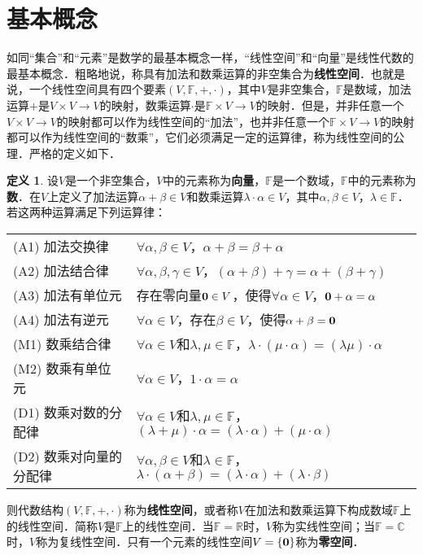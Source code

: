 \documentclass[a4paper,fontset=windows]{ctexbook}
\theoremstyle{definition}
\newtheorem{definition}{定义}[chapter]
\begin{document}
\section{基本概念}

如同“集合”和“元素”是数学的最基本概念一样，“线性空间”和“向量”是线性代数的最基本概念．粗略地说，称具有加法和数乘运算的非空集合为{\bf 线性空间}．也就是说，一个线性空间具有四个要素$(V,\mathbb{F},+,\cdot)$，其中$V$是非空集合，$\mathbb{F}$是数域，加法运算$+$是$V\times V\to V$的映射，数乘运算$\cdot$是$\mathbb{F}\times V\to V$的映射．但是，并非任意一个$V\times V\to V$的映射都可以作为线性空间的“加法”，也并非任意一个$\mathbb{F}\times V\to V$的映射都可以作为线性空间的“数乘”，它们必须满足一定的运算律，称为线性空间的公理．严格的定义如下．

\begin{definition}\label{def8.1}
设$V$是一个非空集合，$V$中的元素称为{\bf 向量}，$\mathbb{F}$是一个数域，$\mathbb{F}$中的元素称为{\bf 数}．在$V$上定义了加法运算$\alpha+\beta\in V$和数乘运算$\lambda\cdot\alpha\in V$，其中$\alpha,\beta\in V$，$\lambda\in\mathbb{F}$．若这两种运算满足下列运算律：
\begin{center}\begin{tabular}{ll}
(A1) 加法交换律 & $\forall\alpha,\beta\in V$，$\alpha+\beta=\beta+\alpha$ \\
(A2) 加法结合律 & $\forall\alpha,\beta,\gamma\in V$，$(\alpha+\beta)+\gamma=\alpha+(\beta+\gamma)$ \\
(A3) 加法有单位元 & 存在零向量${\bf 0}\in V$，使得$\forall \alpha\in V$，${\bf 0}+\alpha=\alpha$ \\
(A4) 加法有逆元 & $\forall\alpha\in V$，存在$\beta\in V$，使得$\alpha+\beta={\bf 0}$ \\
(M1) 数乘结合律 & $\forall\alpha\in V$和$\lambda,\mu\in\mathbb{F}$，$\lambda\cdot(\mu\cdot\alpha)=(\lambda\mu)\cdot\alpha$ \\
(M2) 数乘有单位元 & $\forall\alpha\in V$，$1\cdot\alpha=\alpha$ \\
(D1) 数乘对数的分配律 & $\forall\alpha\in V$和$\lambda,\mu\in\mathbb{F}$，$(\lambda+\mu)\cdot\alpha=(\lambda\cdot\alpha)+(\mu\cdot\alpha)$ \\
(D2) 数乘对向量的分配律 & $\forall\alpha,\beta\in V$和$\lambda\in\mathbb{F}$，$\lambda\cdot(\alpha+\beta)=(\lambda\cdot\alpha)+(\lambda\cdot\beta)$
\end{tabular}\end{center}
则代数结构$(V,\mathbb{F},+,\cdot)$称为{\bf 线性空间}，或者称$V$在加法和数乘运算下构成数域$\mathbb{F}$上的线性空间．简称$V$是$\mathbb{F}$上的线性空间．当$\mathbb{F=R}$时，$V$称为实线性空间；当$\mathbb{F=C}$时，$V$称为复线性空间．只有一个元素的线性空间$V=\{\bf 0\}$称为{\bf 零空间}．
\end{definition}
\end{document}
